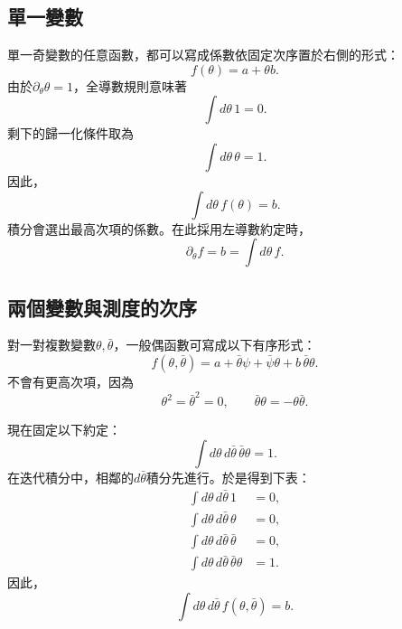 \subsection{單一變數}

單一奇變數的任意函數，都可以寫成係數依固定次序置於右側的形式：
\begin{equation}
f(\theta)=a+\theta b.
\end{equation}
由於\(\partial_\theta\theta=1\)，全導數規則意味著
\begin{equation}
\int d\theta\,1=0.
\end{equation}
剩下的歸一化條件取為
\begin{equation}
\int d\theta\,\theta=1.
\end{equation}
因此，
\begin{equation}
\int d\theta\,f(\theta)=b.
\end{equation}
積分會選出最高次項的係數。在此採用左導數約定時，
\begin{equation}
\partial_\theta f=b
=\int d\theta\,f.
\end{equation}

\begin{classroomqa}
\end{classroomqa}

\subsection{兩個變數與測度的次序}

對一對複數變數\(\theta,\bar\theta\)，一般偶函數可寫成以下有序形式：
\begin{equation}
f(\theta,\bar\theta)
=a+\bar\theta\psi+\bar\psi\theta+b\,\bar\theta\theta.
\end{equation}
不會有更高次項，因為
\begin{equation}
\theta^2=\bar\theta^2=0,
\qquad
\bar\theta\theta=-\theta\bar\theta.
\end{equation}

現在固定以下約定：
\begin{equation}
\int d\theta\,d\bar\theta\,
\bar\theta\theta=1.
\end{equation}
在迭代積分中，相鄰的\(d\bar\theta\)積分先進行。於是得到下表：
\begin{align}
\int d\theta\,d\bar\theta\,1&=0,\\
\int d\theta\,d\bar\theta\,\theta&=0,\\
\int d\theta\,d\bar\theta\,\bar\theta&=0,\\
\int d\theta\,d\bar\theta\,\bar\theta\theta&=1.
\end{align}
因此，
\begin{equation}
\int d\theta\,d\bar\theta\,
f(\theta,\bar\theta)=b.
\end{equation}

